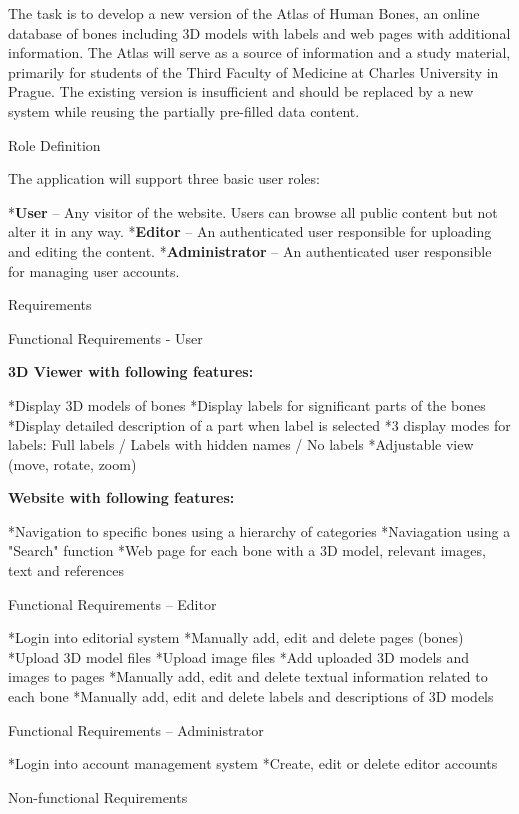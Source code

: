 The task is to develop a new version of the Atlas of Human Bones, an online database of bones including 3D models with labels and web pages with additional information. The Atlas will serve as a source of information and a study material, primarily for students of the Third Faculty of Medicine at Charles University in Prague. The existing version is insufficient and should be replaced by a new system while reusing the partially pre-filled data content.

\sec Role Definition

The application will support three basic user roles:

\begitems
*{\bf User} -- Any visitor of the website. Users can browse all public content but not alter it in any way.
*{\bf Editor} -- An authenticated user responsible for uploading and editing the content.
*{\bf Administrator} -- An authenticated user responsible for managing user accounts.
\enditems

\sec Requirements

\secc Functional Requirements - User

\vskip 10pt
{\bf 3D Viewer with following features:}

\begitems
*Display 3D models of bones
*Display labels for significant parts of the bones
*Display detailed description of a part when label is selected
*3 display modes for labels: Full labels / Labels with hidden names / No labels
*Adjustable view (move, rotate, zoom)
\enditems

\vskip 10pt
{\bf Website with following features:}

\begitems
*Navigation to specific bones using a hierarchy of categories
*Naviagation using a "Search" function
*Web page for each bone with a 3D model, relevant images, text and references
\enditems

\secc Functional Requirements – Editor

\begitems
*Login into editorial system
*Manually add, edit and delete pages (bones)
*Upload 3D model files
*Upload image files
*Add uploaded 3D models and images to pages
*Manually add, edit and delete textual information related to each bone
*Manually add, edit and delete labels and descriptions of 3D models
\enditems

\secc Functional Requirements – Administrator

\begitems
*Login into account management system
*Create, edit or delete editor accounts
\enditems

\secc Non-functional Requirements

